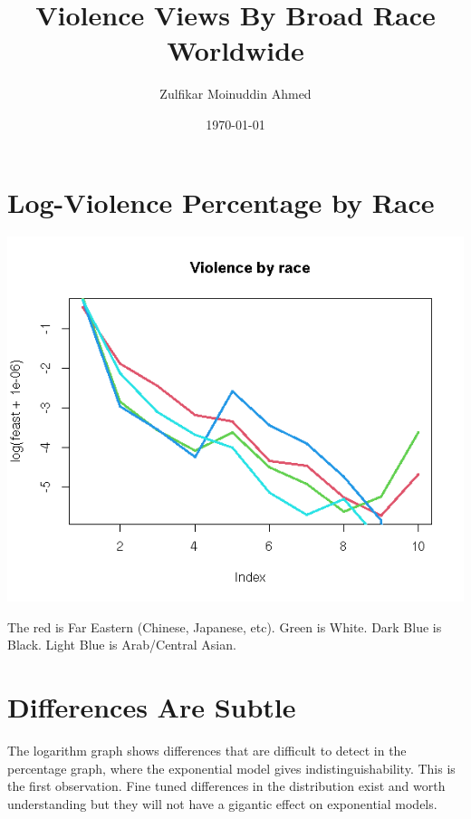 \documentclass{amsart}
\title{Violence Views By Broad Race Worldwide}
\author{Zulfikar Moinuddin Ahmed}
\date{\today}
\begin{document}
\maketitle

\section{Log-Violence Percentage by Race}

\includegraphics[scale=0.8]{vrace.jpeg}

The red is Far Eastern (Chinese, Japanese, etc). Green is White.  Dark Blue is Black.  Light Blue is Arab/Central Asian.

\section{Differences Are Subtle}

The logarithm graph shows differences that are difficult to detect in the percentage graph, where the exponential model gives indistinguishability.  This is the first observation.  Fine tuned differences in the distribution exist and worth understanding but they will not have a gigantic effect on exponential models.
\end{document}
